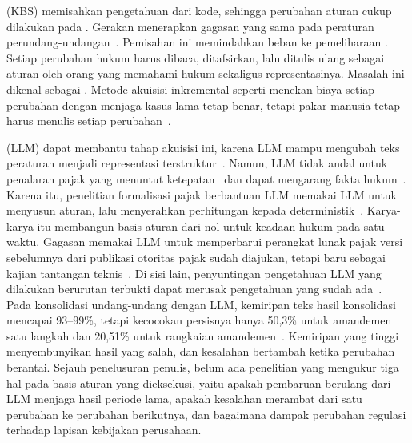 (KBS) memisahkan pengetahuan dari kode, sehingga perubahan aturan cukup dilakukan pada . Gerakan  menerapkan gagasan yang sama pada peraturan perundang-undangan~\cite{merigoux2021catala,mowbray2023scaling,kowalski2022logicalenglish}. Pemisahan ini memindahkan beban ke pemeliharaan . Setiap perubahan hukum harus dibaca, ditafsirkan, lalu ditulis ulang sebagai aturan oleh orang yang memahami hukum sekaligus representasinya. Masalah ini dikenal sebagai . Metode akuisisi inkremental seperti  menekan biaya setiap perubahan dengan menjaga kasus lama tetap benar, tetapi pakar manusia tetap harus menulis setiap perubahan~\cite{compton2021rippledown}.

 (LLM) dapat membantu tahap akuisisi ini, karena LLM mampu mengubah teks peraturan menjadi representasi terstruktur~\cite{janatian2023texttostructure}. Namun, LLM tidak andal untuk penalaran pajak yang menuntut ketepatan~\cite{blairstanek2023gpt3,nay2024taxattorneys} dan dapat mengarang fakta hukum~\cite{dahl2024legalfictions,magesh2025hallucination}. Karena itu, penelitian formalisasi pajak berbantuan LLM memakai LLM untuk menyusun aturan, lalu menyerahkan perhitungan kepada  deterministik~\cite{veeramani2026neurosymbolic,yadamsuren2026formalization,lorenzo2025translating,jurayj2026tax}. Karya-karya itu membangun basis aturan dari nol untuk keadaan hukum pada satu waktu. Gagasan memakai LLM untuk memperbarui perangkat lunak pajak versi sebelumnya dari publikasi otoritas pajak sudah diajukan, tetapi baru sebagai kajian tantangan teknis~\cite{goganikhiabani2025maintaining}. Di sisi lain, penyuntingan pengetahuan LLM yang dilakukan berurutan terbukti dapat merusak pengetahuan yang sudah ada~\cite{gupta2024forgetting,gu2024harms}. Pada konsolidasi undang-undang dengan LLM, kemiripan teks hasil konsolidasi mencapai 93--99\%, tetapi kecocokan persisnya hanya 50,3\% untuk amandemen satu langkah dan 20,51\% untuk rangkaian amandemen~\cite{prior2025risks}. Kemiripan yang tinggi menyembunyikan hasil yang salah, dan kesalahan bertambah ketika perubahan berantai. Sejauh penelusuran penulis, belum ada penelitian yang mengukur tiga hal pada basis aturan yang dieksekusi, yaitu apakah pembaruan berulang dari LLM menjaga hasil periode lama, apakah kesalahan merambat dari satu perubahan ke perubahan berikutnya, dan bagaimana dampak perubahan regulasi terhadap lapisan kebijakan perusahaan.

